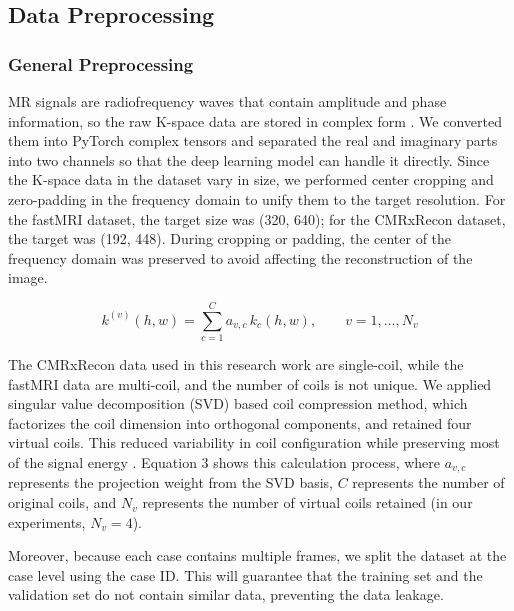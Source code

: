 \documentclass[12pt,a4paper]{article}
\begin{document}
\subsection{Data Preprocessing}

\subsubsection{General Preprocessing}
MR signals are radiofrequency waves that contain amplitude and phase information, so the raw K-space data are stored in complex form \cite{2}. We converted them into PyTorch complex tensors and separated the real and imaginary parts into two channels so that the deep learning model can handle it directly. Since the K-space data in the dataset vary in size, we performed center cropping and zero-padding in the frequency domain to unify them to the target resolution. For the fastMRI dataset, the target size was (320, 640); for the CMRxRecon dataset, the target was (192, 448). During cropping or padding, the center of the frequency domain was preserved to avoid affecting the reconstruction of the image.

\begin{equation}
k^{(v)}(h,w) = \sum_{c=1}^{C} a_{v,c}\, k_c(h,w), \qquad v=1,\ldots,N_v 
\end{equation}

The CMRxRecon data used in this research work are single-coil, while the fastMRI data are multi-coil, and the number of coils is not unique. We applied singular value decomposition (SVD) based coil compression method, which factorizes the coil dimension into orthogonal components, and retained four virtual coils. This reduced variability in coil configuration while preserving most of the signal energy \cite{20}. Equation 3 shows this calculation process, where \(a_{v,c}\) represents the projection weight from the SVD basis, \(C\) represents the number of original coils, and \(N_v\) represents the number of virtual coils retained (in our experiments, \(N_v=4\)).

Moreover, because each case contains multiple frames, we split the dataset at the case level using the case ID. This will guarantee that the training set and the validation set do not contain similar data, preventing the data leakage.
\end{document}
